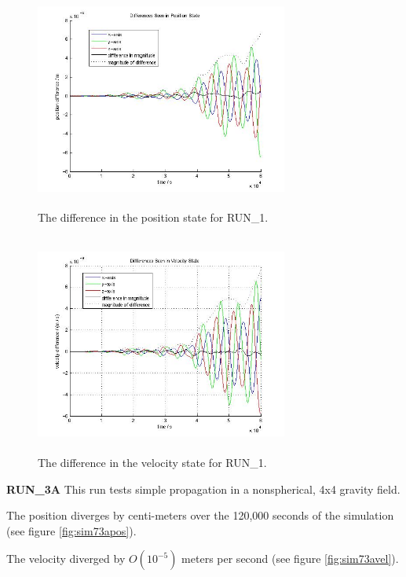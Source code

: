 \begin{description}
\begin{figure}[htp]
\begin{center}
\includegraphics[width=3.2736in,height=2.85in]{figures/run1pos.jpg}
\caption{The difference in the position state for RUN\_1.}
\label{fig:sim71pos}
\end{center}
\end{figure}

\begin{figure}[htp]
\begin{center}
\includegraphics[width=3.2736in,height=2.85in]{figures/run1vel.jpg}
\caption{The difference in the velocity state for RUN\_1.}
\label{fig:sim71vel}
\end{center}
\end{figure}
 
\clearpage
{\bf RUN\_3A}
This run tests simple propagation in a nonspherical, 4x4 gravity field. 

The position diverges by centi-meters over the 120,000 seconds of the 
simulation (see figure \ref{fig:sim73apos}).

The velocity diverged by $O(10^{-5})$ meters per second (see figure 
\ref{fig:sim73avel}).



\end{description}
